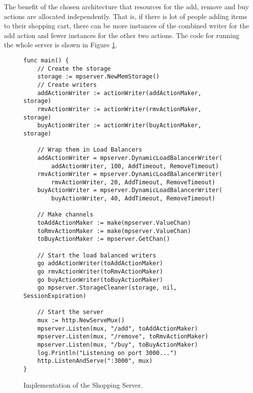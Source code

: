 The benefit of the chosen architecture that resources for the add, remove
and buy actions are allocated independently. That is, if there is lot of 
people adding items to their shopping cart, there can be more instances
of the combined writer for the add action and fewer instances for the
other two actions. The code for running the whole server is shown
in Figure \ref{fig:ShoppingCode}.
\begin{figure}[h]
\begin{lstlisting}
func main() {
    // Create the storage
    storage := mpserver.NewMemStorage()
    // Create writers
    addActionWriter := actionWriter(addActionMaker, storage)
    rmvActionWriter := actionWriter(rmvActionMaker, storage)
    buyActionWriter := actionWriter(buyActionMaker, storage)

    // Wrap them in Load Balancers
    addActionWriter = mpserver.DynamicLoadBalancerWriter(
        addActionWriter, 100, AddTimeout, RemoveTimeout)
    rmvActionWriter = mpserver.DynamicLoadBalancerWriter(
        rmvActionWriter, 20, AddTimeout, RemoveTimeout)
    buyActionWriter = mpserver.DynamicLoadBalancerWriter(
        buyActionWriter, 40, AddTimeout, RemoveTimeout)

    // Make channels
    toAddActionMaker := make(mpserver.ValueChan)
    toRmvActionMaker := make(mpserver.ValueChan)
    toBuyActionMaker := mpserver.GetChan()

    // Start the load balanced writers
    go addActionWriter(toAddActionMaker)
    go rmvActionWriter(toRmvActionMaker)
    go buyActionWriter(toBuyActionMaker)
    go mpserver.StorageCleaner(storage, nil, SessionExpiration)

    // Start the server
    mux := http.NewServeMux()
    mpserver.Listen(mux, "/add", toAddActionMaker)
    mpserver.Listen(mux, "/remove", toRmvActionMaker)
    mpserver.Listen(mux, "/buy", toBuyActionMaker)
    log.Println("Listening on port 3000...")
    http.ListenAndServe(":3000", mux)
}
\end{lstlisting}
\caption[scale=1.0]{Implementation of the Shopping Server.}
\label{fig:ShoppingCode}
\end{figure}



